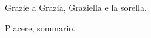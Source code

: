 \documentclass[11pt]{toptesi}
\begin{document}
\frontespizio




\ringraziamenti
Grazie a Grazia, Graziella e la sorella.


\sommario
Piacere, sommario.



\tableofcontents


\mainmatter






\nocite{*}
\printbibliography
\end{document}
